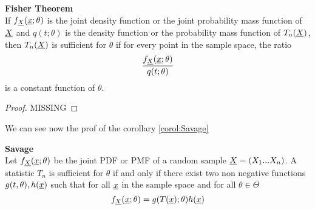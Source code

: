 \begin{teo}\textbf{Fisher Theorem}\\
	If $f_{\underline X}(\underline{x};\theta)$ is the joint density function or the joint probability mass function of $\underline X$ and $q(t;\theta)$ is the density function or the probability mass function of $T_n(\underline X)$, then $T_n(\underline X)$ is sufficient for $\theta$ if for every point in the sample space, the ratio
	$$\frac{f_{\underline X}(\underline{x};\theta)}{q(t;\theta)}$$ 
	is a constant function of $\theta$.
\end{teo}
\begin{proof}
	MISSING
\end{proof}
We can see now the prof of the corollary \ref{corol:Savage}
\begin{corol}\textbf{Savage}\\
	Let $f_{\underline X}(\underline{x};\theta)$ be the joint PDF or PMF of a random sample $\underline X=(X_1... X_n)$. A statistic $T_n$ is sufficient for $\theta$ if and only if there exist two non negative functions $g(t,\theta), h(\underline x)$ such that for all $\underline x$ in the sample space and for all $\theta\in \Theta$ 
	$$f_{\underline X}(\underline{x};\theta)=g(T(\underline x);\theta)h(\underline x)$$
\end{corol}

